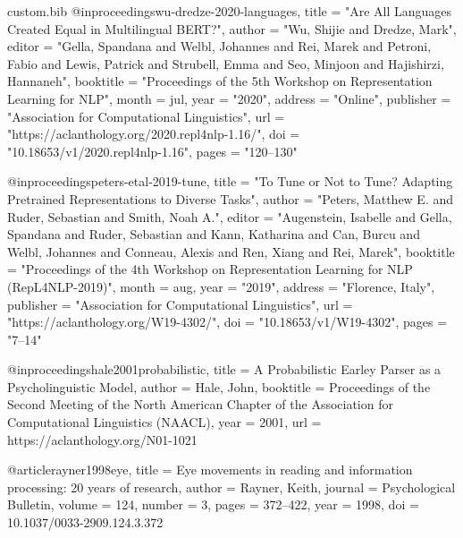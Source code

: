 \begin{filecontents*}[overwrite]{custom.bib}
@inproceedings{wu-dredze-2020-languages,
    title = "Are All Languages Created Equal in Multilingual {BERT}?",
    author = "Wu, Shijie  and
      Dredze, Mark",
    editor = "Gella, Spandana  and
      Welbl, Johannes  and
      Rei, Marek  and
      Petroni, Fabio  and
      Lewis, Patrick  and
      Strubell, Emma  and
      Seo, Minjoon  and
      Hajishirzi, Hannaneh",
    booktitle = "Proceedings of the 5th Workshop on Representation Learning for NLP",
    month = jul,
    year = "2020",
    address = "Online",
    publisher = "Association for Computational Linguistics",
    url = "https://aclanthology.org/2020.repl4nlp-1.16/",
    doi = "10.18653/v1/2020.repl4nlp-1.16",
    pages = "120--130"
}

@inproceedings{peters-etal-2019-tune,
    title = "To Tune or Not to Tune? Adapting Pretrained Representations to Diverse Tasks",
    author = "Peters, Matthew E.  and
      Ruder, Sebastian  and
      Smith, Noah A.",
    editor = "Augenstein, Isabelle  and
      Gella, Spandana  and
      Ruder, Sebastian  and
      Kann, Katharina  and
      Can, Burcu  and
      Welbl, Johannes  and
      Conneau, Alexis  and
      Ren, Xiang  and
      Rei, Marek",
    booktitle = "Proceedings of the 4th Workshop on Representation Learning for NLP (RepL4NLP-2019)",
    month = aug,
    year = "2019",
    address = "Florence, Italy",
    publisher = "Association for Computational Linguistics",
    url = "https://aclanthology.org/W19-4302/",
    doi = "10.18653/v1/W19-4302",
    pages = "7--14"
}

@inproceedings{hale2001probabilistic,
  title        = {A Probabilistic {Earley} Parser as a Psycholinguistic Model},
  author       = {Hale, John},
  booktitle    = {Proceedings of the Second Meeting of the North American Chapter of the Association for Computational Linguistics (NAACL)},
  year         = {2001},
  url          = {https://aclanthology.org/N01-1021}
}

@article{rayner1998eye,
  title        = {Eye movements in reading and information processing: 20 years of research},
  author       = {Rayner, Keith},
  journal      = {Psychological Bulletin},
  volume       = {124},
  number       = {3},
  pages        = {372--422},
  year         = {1998},
  doi          = {10.1037/0033-2909.124.3.372}
}


\end{filecontents*}
